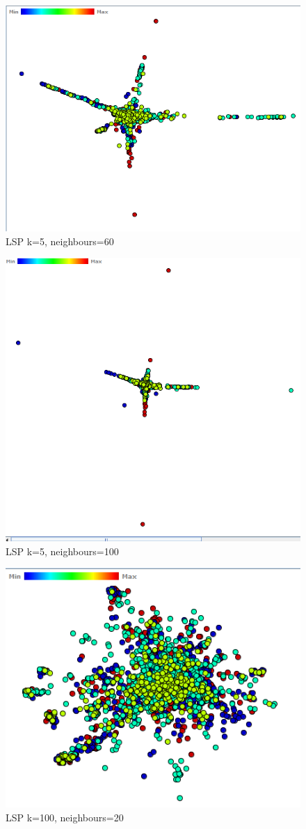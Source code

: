 \documentclass[ 10pt ]{fphw}
\begin{document}
\begin{center}
\begin{figure}[H]
    \centering
	\includegraphics[width=0.65\columnwidth]{task2c/reutersLSP-k65-N60.PNG}
	\caption{LSP k=5, neighbours=60}
	\label{fig:reutlsp66.60}
	\end{figure}
\end{center}

\begin{center}
\begin{figure}[H]
    \centering
	\includegraphics[width=0.65\columnwidth]{task2c/reutersLSP-k65-N100.PNG}
	\caption{LSP k=5, neighbours=100}
	\label{fig:reutlsp65.100}
	\end{figure}
\end{center}

\begin{center}
\begin{figure}[H]
    \centering
	\includegraphics[width=0.65\columnwidth]{task2c/reutersLSP-k100-N20.PNG}
	\caption{LSP k=100, neighbours=20}
	\label{}
	\end{figure}
\end{center}
\end{document}
